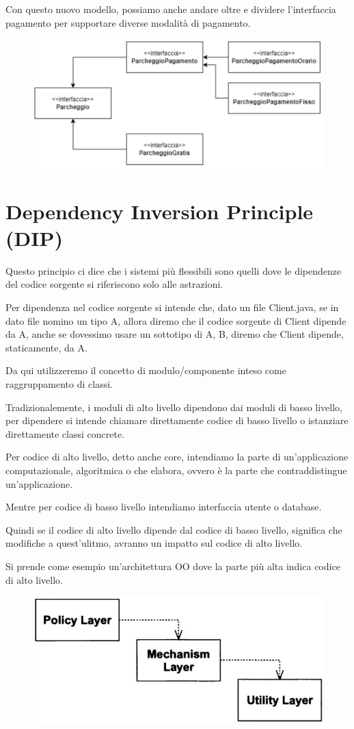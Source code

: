 Con questo nuovo modello, possiamo anche andare oltre e dividere l'interfaccia pagamento per supportare diverse modalità di pagamento.

\begin{figure}[H]
  \centering
  \includegraphics[width=0.5\linewidth]{../../immagini/principio_SOLID/refactoring_interfaccia.png}
\end{figure}

\section{Dependency Inversion Principle (DIP)}

Questo principio ci dice che i sistemi più flessibili sono quelli dove le dipendenze del codice sorgente si riferiscono solo alle astrazioni.

Per dipendenza nel codice sorgente si intende che, dato un file Client.java, se in dato file nomino un tipo A, allora diremo che il codice sorgente di Client dipende 
da A, anche se dovessimo usare un sottotipo di A, B, diremo che Client dipende, staticamente, da A.

Da qui utilizzeremo il concetto di modulo/componente inteso come raggruppamento di classi.

Tradizionalemente, i moduli di alto livello dipendono dai moduli di basso livello, per dipendere si intende chiamare direttamente codice di basso livello o istanziare
direttamente classi concrete.

Per codice di alto livello, detto anche core, intendiamo la parte di un'applicazione computazionale, algoritmica o che elabora, ovvero è la parte che contraddistingue 
un'applicazione.

Mentre per codice di basso livello intendiamo interfaccia utente o database.

Quindi se il codice di alto livello dipende dal codice di basso livello, significa che modifiche a quest'ulitmo, avranno un impatto sul codice di alto livello.

\newpage
Si prende come esempio un'architettura OO dove la parte più alta indica codice di alto livello.
\begin{figure}
  \includegraphics[width=0.5\linewidth]{../../immagini/principio_SOLID/architetturaOOnoDIP}  
\end{figure}

